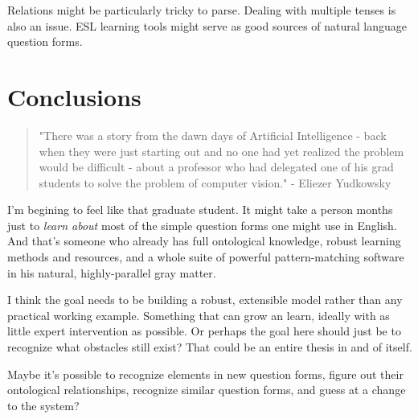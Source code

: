 \documentclass[11pt]{article}
\begin{document}
Relations might be particularly tricky to parse.
Dealing with multiple tenses is also an issue.
ESL learning tools might serve as good sources of natural language question forms. \cite{esl}

\section*{Conclusions}

\begin{quote}
"There was a story from the dawn days of Artificial Intelligence
- back when they were just starting out and no one had yet realized
the problem would be difficult - about a professor who had
delegated one of his grad students to solve the problem of computer
vision." - Eliezer Yudkowsky \cite{hpmor}
\end{quote}

I'm begining to feel like that graduate student.
It might take a person months just to {\em learn about} most of the simple question
forms one might use in English. And that's someone who already has full 
ontological knowledge, robust learning methods and resources, and a whole
suite of powerful pattern-matching software in his natural, highly-parallel
gray matter.

I think the goal needs to be building a robust, extensible model rather than any
practical working example. Something that can grow an learn, ideally with as little
expert intervention as possible.
Or perhaps the goal here should just be to recognize what obstacles still exist?
That could be an entire thesis in and of itself.

Maybe it's possible to recognize elements in new question forms, figure out their
ontological relationships, recognize similar question forms, and guess at a change
to the system?

{}

\end{document}
